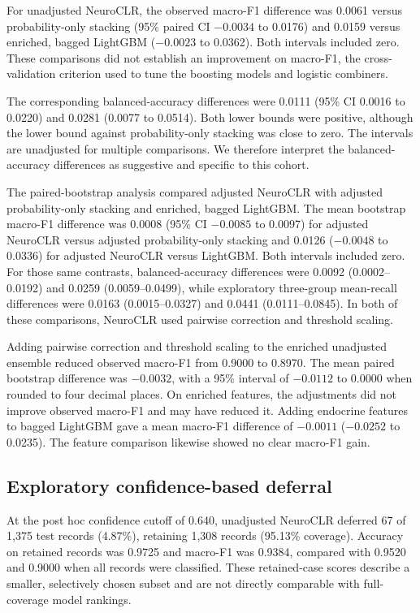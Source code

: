 For unadjusted NeuroCLR, the observed macro-F1 difference was 0.0061 versus probability-only stacking (95\% paired CI $-0.0034$ to 0.0176) and 0.0159 versus enriched, bagged LightGBM ($-0.0023$ to 0.0362). Both intervals included zero. These comparisons did not establish an improvement on macro-F1, the cross-validation criterion used to tune the boosting models and logistic combiners.

The corresponding balanced-accuracy differences were 0.0111 (95\% CI 0.0016 to 0.0220) and 0.0281 (0.0077 to 0.0514). Both lower bounds were positive, although the lower bound against probability-only stacking was close to zero. The intervals are unadjusted for multiple comparisons. We therefore interpret the balanced-accuracy differences as suggestive and specific to this cohort.

The paired-bootstrap analysis compared adjusted NeuroCLR with adjusted probability-only stacking and enriched, bagged LightGBM. The mean bootstrap macro-F1 difference was 0.0008 (95\% CI $-0.0085$ to 0.0097) for adjusted NeuroCLR versus adjusted probability-only stacking and 0.0126 ($-0.0048$ to 0.0336) for adjusted NeuroCLR versus LightGBM. Both intervals included zero. For those same contrasts, balanced-accuracy differences were 0.0092 (0.0002--0.0192) and 0.0259 (0.0059--0.0499), while exploratory three-group mean-recall differences were 0.0163 (0.0015--0.0327) and 0.0441 (0.0111--0.0845). In both of these comparisons, NeuroCLR used pairwise correction and threshold scaling.

Adding pairwise correction and threshold scaling to the enriched unadjusted ensemble reduced observed macro-F1 from 0.9000 to 0.8970. The mean paired bootstrap difference was $-0.0032$, with a 95\% interval of $-0.0112$ to 0.0000 when rounded to four decimal places. On enriched features, the adjustments did not improve observed macro-F1 and may have reduced it. Adding endocrine features to bagged LightGBM gave a mean macro-F1 difference of $-0.0011$ ($-0.0252$ to 0.0235). The feature comparison likewise showed no clear macro-F1 gain.

\subsection{Exploratory confidence-based deferral}

At the post hoc confidence cutoff of 0.640, unadjusted NeuroCLR deferred 67 of 1{,}375 test records (4.87\%), retaining 1{,}308 records (95.13\% coverage). Accuracy on retained records was 0.9725 and macro-F1 was 0.9384, compared with 0.9520 and 0.9000 when all records were classified. These retained-case scores describe a smaller, selectively chosen subset and are not directly comparable with full-coverage model rankings.

